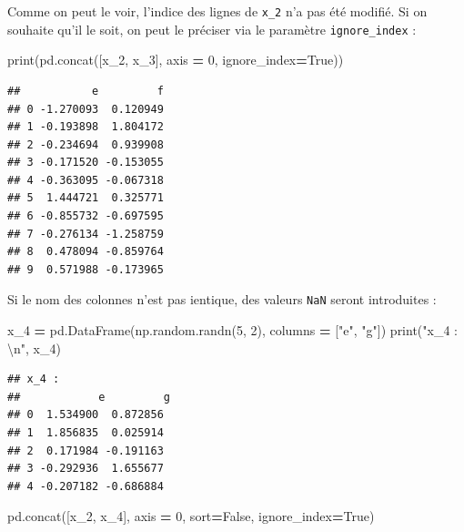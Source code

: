 \documentclass[12pt,]{book}
\newenvironment{Shaded}{\begin{snugshade}}{\end{snugshade}}
\newcommand{\DecValTok}[1]{\textcolor[rgb]{0.00,0.00,0.81}{#1}}
\newcommand{\CharTok}[1]{\textcolor[rgb]{0.31,0.60,0.02}{#1}}
\newcommand{\StringTok}[1]{\textcolor[rgb]{0.31,0.60,0.02}{#1}}
\newcommand{\VariableTok}[1]{\textcolor[rgb]{0.00,0.00,0.00}{#1}}
\newcommand{\OperatorTok}[1]{\textcolor[rgb]{0.81,0.36,0.00}{\textbf{#1}}}
\newcommand{\BuiltInTok}[1]{#1}
\newcommand{\NormalTok}[1]{#1}
\numberwithin{equation}{section}
\numberwithin{countremarque}{section}
\begin{document}
Comme on peut le voir, l'indice des lignes de \texttt{x\_2} n'a pas été
modifié. Si on souhaite qu'il le soit, on peut le préciser via le
paramètre \texttt{ignore\_index} :

\begin{Shaded}
\begin{Highlighting}[]
\BuiltInTok{print}\NormalTok{(pd.concat([x_2, x_3], axis }\OperatorTok{=} \DecValTok{0}\NormalTok{, ignore_index}\OperatorTok{=}\VariableTok{True}\NormalTok{))}
\end{Highlighting}
\end{Shaded}

\begin{lstlisting}
##           e         f
## 0 -1.270093  0.120949
## 1 -0.193898  1.804172
## 2 -0.234694  0.939908
## 3 -0.171520 -0.153055
## 4 -0.363095 -0.067318
## 5  1.444721  0.325771
## 6 -0.855732 -0.697595
## 7 -0.276134 -1.258759
## 8  0.478094 -0.859764
## 9  0.571988 -0.173965
\end{lstlisting}

Si le nom des colonnes n'est pas ientique, des valeurs \texttt{NaN}
seront introduites :

\begin{Shaded}
\begin{Highlighting}[]
\NormalTok{x_4 }\OperatorTok{=}\NormalTok{ pd.DataFrame(np.random.randn(}\DecValTok{5}\NormalTok{, }\DecValTok{2}\NormalTok{),}
\NormalTok{                   columns }\OperatorTok{=}\NormalTok{ [}\StringTok{"e"}\NormalTok{, }\StringTok{"g"}\NormalTok{])}
\BuiltInTok{print}\NormalTok{(}\StringTok{"x_4 : }\CharTok{\textbackslash{}n}\StringTok{"}\NormalTok{, x_4)}
\end{Highlighting}
\end{Shaded}

\begin{lstlisting}
## x_4 : 
##            e         g
## 0  1.534900  0.872856
## 1  1.856835  0.025914
## 2  0.171984 -0.191163
## 3 -0.292936  1.655677
## 4 -0.207182 -0.686884
\end{lstlisting}

\begin{Shaded}
\begin{Highlighting}[]
\NormalTok{pd.concat([x_2, x_4], axis }\OperatorTok{=} \DecValTok{0}\NormalTok{, sort}\OperatorTok{=}\VariableTok{False}\NormalTok{, ignore_index}\OperatorTok{=}\VariableTok{True}\NormalTok{)}
\end{Highlighting}
\end{Shaded}
\end{document}
